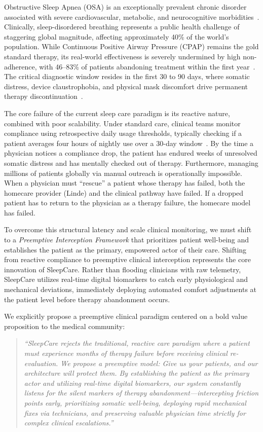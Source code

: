 \documentclass[conference]{IEEEtran}
\begin{document}
Obstructive Sleep Apnea (OSA) is an exceptionally prevalent chronic disorder associated with severe cardiovascular, metabolic, and neurocognitive morbidities~\cite{epstein2009}. Clinically, sleep-disordered breathing represents a public health challenge of staggering global magnitude, affecting approximately 40\% of the world's population. While Continuous Positive Airway Pressure (CPAP) remains the gold standard therapy, its real-world effectiveness is severely undermined by high non-adherence, with 46--83\% of patients abandoning treatment within the first year~\cite{weaver2008,sawyer2011}. The critical diagnostic window resides in the first 30 to 90 days, where somatic distress, device claustrophobia, and physical mask discomfort drive permanent therapy discontinuation~\cite{sawyer2011}.

The core failure of the current sleep care paradigm is its reactive nature, combined with poor scalability. Under standard care, clinical teams monitor compliance using retrospective daily usage thresholds, typically checking if a patient averages four hours of nightly use over a 30-day window~\cite{stepnowsky2007,kakaei2024bhi}. By the time a physician notices a compliance drop, the patient has endured weeks of unresolved somatic distress and has mentally checked out of therapy. Furthermore, managing millions of patients globally via manual outreach is operationally impossible. When a physician must ``rescue'' a patient whose therapy has failed, both the homecare provider (Linde) and the clinical pathway have failed. If a dropped patient has to return to the physician as a therapy failure, the homecare model has failed.

To overcome this structural latency and scale clinical monitoring, we must shift to a \textit{Preemptive Interception Framework} that prioritizes patient well-being and establishes the patient as the primary, empowered actor of their care. Shifting from reactive compliance to preemptive clinical interception represents the core innovation of SleepCare. Rather than flooding clinicians with raw telemetry, SleepCare utilizes real-time digital biomarkers to catch early physiological and mechanical deviations, immediately deploying automated comfort adjustments at the patient level before therapy abandonment occurs.

We explicitly propose a preemptive clinical paradigm centered on a bold value proposition to the medical community:
\begin{quote}
\textit{``SleepCare rejects the traditional, reactive care paradigm where a patient must experience months of therapy failure before receiving clinical re-evaluation. We propose a preemptive model: Give us your patients, and our architecture will protect them. By establishing the patient as the primary actor and utilizing real-time digital biomarkers, our system constantly listens for the silent markers of therapy abandonment---intercepting friction points early, prioritizing somatic well-being, deploying rapid mechanical fixes via technicians, and preserving valuable physician time strictly for complex clinical escalations.''}
\end{quote}
\end{document}
